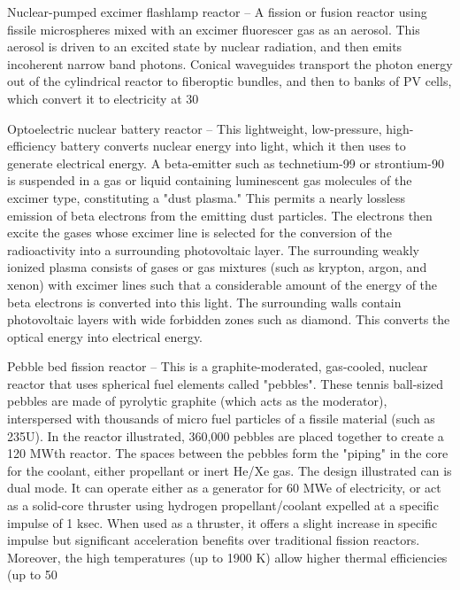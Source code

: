 \documentclass[a4paper]{book}
\begin{document}
Nuclear-pumped excimer flashlamp reactor – A fission or fusion reactor using fissile microspheres mixed with an excimer fluorescer gas as an aerosol.  This aerosol is driven to an excited state by nuclear radiation, and then emits incoherent narrow band photons. Conical waveguides transport the photon energy out of the cylindrical reactor to fiberoptic bundles, and then to banks of PV cells, which convert it to electricity at 30%
 
Optoelectric nuclear battery reactor – This lightweight, low-pressure, high-efficiency battery converts nuclear energy into light, which it then uses to generate electrical energy. A beta-emitter such as technetium-99 or strontium-90 is suspended in a gas or liquid containing luminescent gas molecules of the excimer type, constituting a "dust plasma." This permits a nearly lossless emission of beta electrons from the emitting dust particles. The electrons then excite the gases whose excimer line is selected for the conversion of the radioactivity into a surrounding photovoltaic layer. The surrounding weakly ionized plasma consists of gases or gas mixtures (such as krypton, argon, and xenon) with excimer lines such that a considerable amount of the energy of the beta electrons is converted into this light. The surrounding walls contain photovoltaic layers with wide forbidden zones such as diamond. This converts the optical energy into electrical energy.
 
Pebble bed fission reactor – This is a graphite-moderated, gas-cooled, nuclear reactor that uses spherical fuel elements called "pebbles". These tennis ball-sized pebbles are made of pyrolytic graphite (which acts as the moderator), interspersed with thousands of micro fuel particles of a fissile material (such as 235U). In the reactor illustrated, 360,000 pebbles are placed together to create a 120 MWth reactor. The spaces between the pebbles form the "piping" in the core for the coolant, either propellant or inert He/Xe gas. The design illustrated can is dual mode. It can operate either as a generator for 60 MWe of electricity, or act as a solid-core thruster using hydrogen propellant/coolant expelled at a specific impulse of 1 ksec. When used as a thruster, it offers a slight increase in specific impulse but significant acceleration benefits over traditional fission reactors.  Moreover, the high temperatures (up to 1900 K) allow higher thermal efficiencies (up to 50%
 
\end{document}
